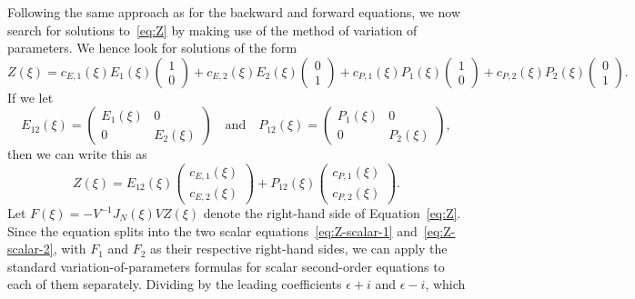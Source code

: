 \documentclass[11pt]{article}
\begin{document}
Following the same approach as for the backward and forward equations,
we now search for solutions to~\eqref{eq:Z} by making use of the
method of variation of parameters. We hence look for solutions of the
form
\begin{equation*}
  Z(\xi) =
  c_{E,1}(\xi)E_{1}(\xi)\begin{pmatrix} 1 \\ 0 \end{pmatrix}
  + c_{E,2}(\xi)E_{2}(\xi)\begin{pmatrix} 0 \\ 1 \end{pmatrix}
  + c_{P,1}(\xi)P_{1}(\xi)\begin{pmatrix} 1 \\ 0 \end{pmatrix}
  + c_{P,2}(\xi)P_{2}(\xi)\begin{pmatrix} 0 \\ 1 \end{pmatrix}.
\end{equation*}
If we let
\begin{equation*}
  E_{12}(\xi) = \begin{pmatrix} E_{1}(\xi) & 0 \\ 0 & E_{2}(\xi) \end{pmatrix}
  \quad\text{and}\quad
  P_{12}(\xi) = \begin{pmatrix} P_{1}(\xi) & 0 \\ 0 & P_{2}(\xi) \end{pmatrix},
\end{equation*}
then we can write this as
\begin{equation*}
  Z(\xi) =
  E_{12}(\xi)\begin{pmatrix} c_{E,1}(\xi) \\ c_{E,2}(\xi) \end{pmatrix}
  + P_{12}(\xi)\begin{pmatrix} c_{P,1}(\xi) \\ c_{P,2}(\xi) \end{pmatrix}.
\end{equation*}
Let \(F(\xi) = -V^{-1}J_{N}(\xi)VZ(\xi)\) denote the right-hand side
of Equation~\eqref{eq:Z}. Since the equation splits into the two
scalar equations~\eqref{eq:Z-scalar-1} and~\eqref{eq:Z-scalar-2}, with
\(F_{1}\) and \(F_{2}\) as their respective right-hand sides, we can
apply the standard variation-of-parameters formulas for scalar
second-order equations to each of them separately. Dividing by the
leading coefficients \(\epsilon + i\) and \(\epsilon - i\), which
\end{document}
